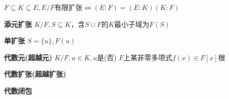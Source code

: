\documentclass[a4paper,10pt]{ctexart}
\renewcommand*{\iff}{\Leftrightarrow}
\newcommand{\set}[1]{\{#1\}}
\begin{document}
\begin{multicols}{3}
    \begin{theorem}[链式法则]
        $F\subseteq K \subseteq E, E/F$有限扩张$\iff (E:F)=(E:K)(K:F)$
    \end{theorem}

    \textbf{添元扩张} $K/F, S\subseteq K$，含$S\cup F$的$K$最小子域为$F(S)$

    \textbf{单扩张} $S = \set{u}, F(u)$

    \textbf{代数元(超越元)} $K/F, u\in K, u$是(否) $F$上某非零多项式$f(x)\in F[x]$根

    \begin{theorem}[单扩张定理]

    \end{theorem}

    \textbf{代数扩张(超越扩张)}

    \textbf{代数闭包}

\end{multicols}
\end{document}
